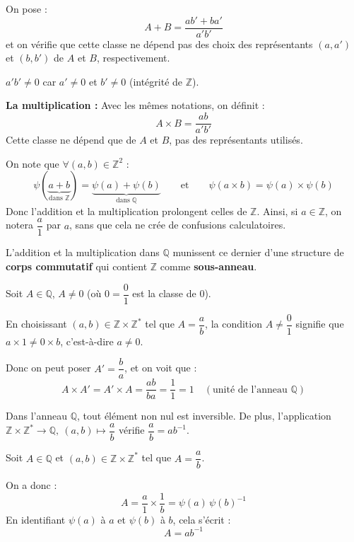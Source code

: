 \documentclass[a4paper,11pt]{article}
\newcommand{\Z}{\mathbb{Z}}
\newcommand{\Q}{\mathbb{Q}}
\newcommand{\mot}[1]{\textcolor{bordeaux}{\textbf{#1}}}
\begin{document}
On pose :
\[
A + B = \frac{ab' + ba'}{a'b'}
\]
et on vérifie que cette classe ne dépend pas des choix des représentants $(a, a')$ et $(b, b')$ de $A$ et $B$, respectivement.

\begin{remarque}[NB]
$a'b' \neq 0$ car $a' \neq 0$ et $b' \neq 0$ (intégrité de $\Z$).
\end{remarque}

\textbf{La multiplication :} Avec les mêmes notations, on définit :
\[
A \times B = \frac{ab}{a'b'}
\]
Cette classe ne dépend que de $A$ et $B$, pas des représentants utilisés.

On note que $\forall (a, b) \in \Z^2$ :
\[
\psi(\underbrace{a + b}_{\text{dans }\Z}) = \underbrace{\psi(a) + \psi(b)}_{\text{dans }\Q} \qquad \text{et} \qquad \psi(a \times b) = \psi(a) \times \psi(b)
\]
Donc l'addition et la multiplication prolongent celles de $\Z$. Ainsi, si $a \in \Z$, on notera $\dfrac{a}{1}$ par $a$, sans que cela ne crée de confusions calculatoires.

\begin{theoreme}
L'addition et la multiplication dans $\Q$ munissent ce dernier d'une structure de \mot{corps commutatif} qui contient $\Z$ comme \mot{sous-anneau}.
\end{theoreme}

\begin{demonstration}
Soit $A \in \Q$, $A \neq 0$ (où $0 = \dfrac{0}{1}$ est la classe de $0$).

En choisissant $(a, b) \in \Z \times \Z^*$ tel que $A = \dfrac{a}{b}$, la condition $A \neq \dfrac{0}{1}$ signifie que $a \times 1 \neq 0 \times b$, c'est-à-dire $a \neq 0$.

Donc on peut poser $A' = \dfrac{b}{a}$, et on voit que :
\[
A \times A' = A' \times A = \frac{ab}{ba} = \frac{1}{1} = 1 \quad (\text{unité de l'anneau } \Q)
\]
\end{demonstration}

\begin{proposition}
Dans l'anneau $\Q$, tout élément non nul est inversible. De plus, l'application $\Z \times \Z^* \to \Q, \ (a, b) \mapsto \dfrac{a}{b}$ vérifie $\dfrac{a}{b} = a b^{-1}$.
\end{proposition}

\begin{demonstration}
Soit $A \in \Q$ et $(a, b) \in \Z \times \Z^*$ tel que $A = \dfrac{a}{b}$.

On a donc :
\[
A = \frac{a}{1} \times \frac{1}{b} = \psi(a) \, \psi(b)^{-1}
\]
En identifiant $\psi(a)$ à $a$ et $\psi(b)$ à $b$, cela s'écrit :
\[
A = a b^{-1}
\]
\end{demonstration}
\end{document}
